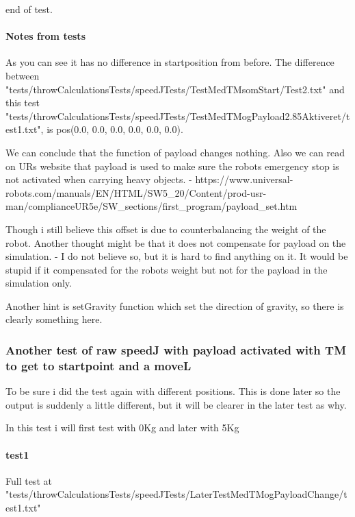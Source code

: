 end of test.\newline 

\paragraph{Notes from tests}
As you can see it has no difference in startposition from before. The difference between "tests/throwCalculationsTests/speedJTests/TestMedTMsomStart/Test2.txt" and this test "tests/throwCalculationsTests/speedJTests/TestMedTMogPayload2.85Aktiveret/test1.txt", is pos(0.0, 0.0, 0.0, 0.0, 0.0, 0.0). \newline 

We can conclude that the function of payload changes nothing. Also we can read on URs website that payload is used to make sure the robots emergency stop is not activated when carrying heavy objects. 
\newline - https://www.universal-robots.com/manuals/EN/HTML/SW5\_20/Content/prod-usr-man/complianceUR5e/SW\_sections/first\_program/payload\_set.htm\newline 

Though i still believe this offset is due to counterbalancing the weight of the robot. 
\newline Another thought might be that it does not compensate for payload on the simulation. - I do not believe so, but it is hard to find anything on it. 
\newline It would be stupid if it compensated for the robots weight but not for the payload in the simulation only.

Another hint is setGravity function which set the direction of gravity, so there is clearly something here. \newline

\subsubsection{Another test of raw speedJ with payload activated with TM to get to startpoint and a moveL}
To be sure i did the test again with different positions. 
\newline This is done later so the output is suddenly a little different, but it will be clearer in the later test as why. \newline 

In this test i will first test with 0Kg and later with 5Kg

\paragraph{test1}
Full test at "tests/throwCalculationsTests/speedJTests/LaterTestMedTMogPayloadChange/test1.txt"

